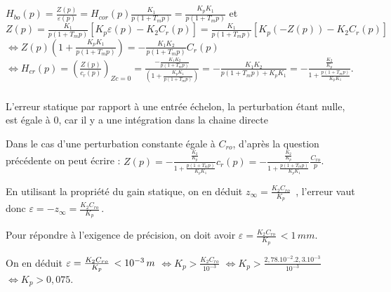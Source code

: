 \newpage
\begin{multicols}{2}
\setcounter{exo}{0}

\subparagraph{}\textit{}%


${H_{bo}}(p) = \frac{{Z(p)}}{{\varepsilon (p)}} = {H_{cor}}(p)\frac{{{K_1}}}{{p(1 + {T_m}p)}} = \frac{{{K_p}{K_1}}}{{p(1 + {T_m}p)}}$
et $Z(p) = \frac{{{K_1}}}{{p(1 + {T_m}p)}}\left[ {{K_p}\varepsilon (p) - {K_2}{C_r}(p)} \right] = \frac{{{K_1}}}{{p(1 + {T_m}p)}}\left[ {{K_p}( - Z(p)) - {K_2}{C_r}(p)} \right]$
$\Leftrightarrow 
Z(p)(1 + \frac{{{K_p}{K_1}}}{{p(1 + {T_m}p)}}) =  - \frac{{{K_1}{K_2}}}{{p(1 + {T_m}p)}}{C_r}(p)$
$\Leftrightarrow 
{H_{cr}}(p) = {\left( {\frac{{Z(p)}}{{{c_r}(p)}}} \right)_{Zc = 0}} = \frac{{ - \frac{{{K_1}{K_2}}}{{p(1 + {T_m}p)}}}}{{(1 + \frac{{{K_p}{K_1}}}{{p(1 + {T_m}p)}})}} =  - \frac{{{K_1}{K_2}}}{{p(1 + {T_m}p) + {K_p}{K_1}}} =  - \frac{{\frac{{{K_2}}}{{{K_p}}}}}{{1 + \frac{{p(1 + {T_m}p)}}{{{K_p}{K_1}}}}}$.

\subparagraph{}\textit{}%

L'erreur statique par rapport  à une entrée échelon, la perturbation étant nulle, est égale à 0, car il y a une intégration dans la chaine directe

Dans le cas d'une perturbation constante égale à $C_{ro}$, d'après la question précédente on peut écrire :  
$
Z(p) =  - \frac{{\frac{{{K_2}}}{{{K_p}}}}}{{1 + \frac{{p(1 + {T_m}p)}}{{{K_p}{K_1}}}}}{c_r}(p) = - \frac{{\frac{{{K_2}}}{{{K_p}}}}}{{1 + \frac{{p(1 + {T_m}p)}}{{{K_p}{K_1}}}}}\frac{{{C_{ro}}}}{p}$.

En utilisant la propriété du gain statique, on en déduit ${z_\infty } =  \frac{{{K_2}{C_{ro}}}}{{{K_p}}}\,$ , l'erreur vaut donc  $\varepsilon  =  -{z_\infty }= \frac{{{K_2}{C_{ro}}}}{{{K_p}}}\,$.

Pour répondre à l'exigence de précision, on doit avoir $\varepsilon  = \frac{{{K_2}{C_{ro}}}}{{{K_p}}}\, < 1\,mm$.

On en déduit $
\varepsilon  =  \frac{{{K_2}{C_{ro}}}}{{{K_p}}}\, < {10^{ - 3}}\,m\\$
$\Leftrightarrow {K_p} > \frac{{{K_2}{C_{ro}}}}{{{{10}^{ - 3}}}}$
$\Leftrightarrow {K_p} > \frac{{{{2,78.10}^{ - 2}}{{.2,3.10}^{ - 3}}}}{{{{10}^{ - 3}}}}$
$\Leftrightarrow 
{K_p} > 0,075$.





\end{multicols}
